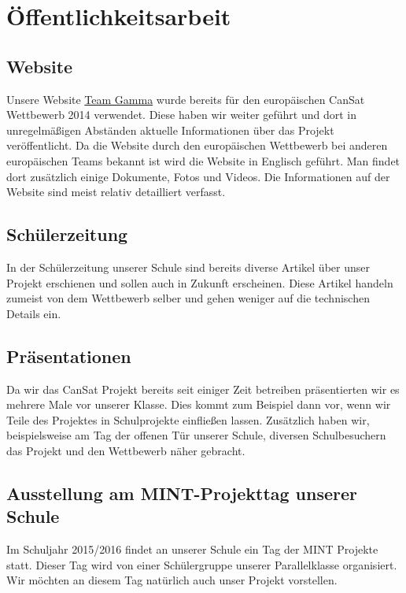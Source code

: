 \section{Öffentlichkeitsarbeit}
\subsection{Website}
Unsere Website \href{www.team-gamma.de}{Team Gamma} wurde bereits für den europäischen CanSat Wettbewerb 2014 verwendet. Diese haben wir weiter geführt und dort in unregelmäßigen Abständen aktuelle Informationen über das Projekt veröffentlicht. Da die Website durch den europäischen Wettbewerb bei anderen europäischen Teams bekannt ist wird die Website in Englisch geführt. Man findet dort zusätzlich einige Dokumente, Fotos und Videos. Die Informationen auf der Website sind meist relativ detailliert verfasst. 

\subsection{Schülerzeitung}
In der Schülerzeitung unserer Schule sind bereits diverse Artikel über unser Projekt erschienen und sollen auch in Zukunft erscheinen. Diese Artikel handeln zumeist von dem Wettbewerb selber und gehen weniger auf die technischen Details ein.

\subsection{Präsentationen}
Da wir das CanSat Projekt bereits seit einiger Zeit betreiben präsentierten wir es mehrere Male vor unserer Klasse. Dies kommt zum Beispiel dann vor, wenn wir Teile des Projektes in Schulprojekte einfließen lassen. Zusätzlich haben wir, beispielsweise am Tag der offenen Tür unserer Schule, diversen Schulbesuchern das Projekt und den Wettbewerb näher gebracht.

\subsection{Ausstellung am MINT-Projekttag unserer Schule}
Im Schuljahr 2015/2016 findet an unserer Schule ein Tag der MINT Projekte statt. Dieser Tag wird von einer Schülergruppe unserer Parallelklasse organisiert. Wir möchten an diesem Tag natürlich auch unser Projekt vorstellen.

